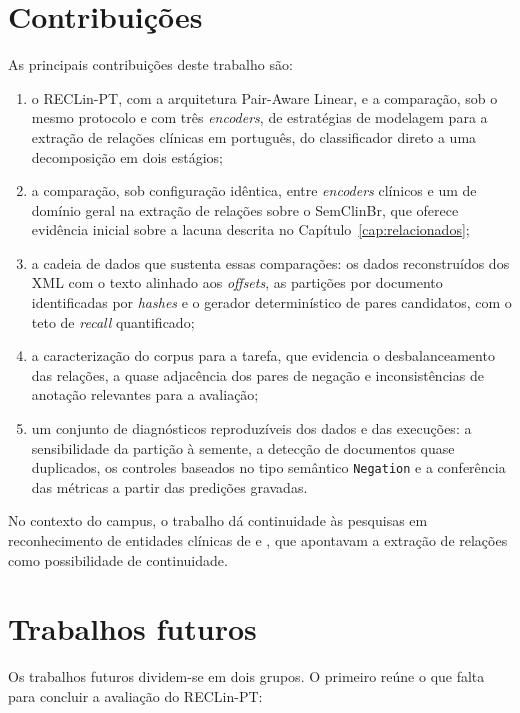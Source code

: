 \section{Contribuições}

As principais contribuições deste trabalho são:

\begin{enumerate}
  \item o RECLin-PT, com a arquitetura Pair-Aware Linear, e a comparação, sob o
        mesmo protocolo e com três \emph{encoders}, de estratégias de modelagem
        para a extração de relações clínicas em português, do classificador direto
        a uma decomposição em dois estágios;
  \item a comparação, sob configuração idêntica, entre \emph{encoders} clínicos e
        um de domínio geral na extração de relações sobre o SemClinBr, que oferece
        evidência inicial sobre a lacuna descrita no
        Capítulo~\ref{cap:relacionados};
  \item a cadeia de dados que sustenta essas comparações: os dados reconstruídos
        dos XML com o texto alinhado aos \emph{offsets}, as partições por documento
        identificadas por \emph{hashes} e o gerador determinístico de pares
        candidatos, com o teto de \emph{recall} quantificado;
  \item a caracterização do corpus para a tarefa, que evidencia o desbalanceamento
        das relações, a quase adjacência dos pares de negação e inconsistências de
        anotação relevantes para a avaliação;
  \item um conjunto de diagnósticos reproduzíveis dos dados e das execuções: a
        sensibilidade da partição à semente, a detecção de documentos quase
        duplicados, os controles baseados no tipo semântico \texttt{Negation} e a
        conferência das métricas a partir das predições gravadas.
\end{enumerate}

No contexto do campus, o trabalho dá continuidade às pesquisas em reconhecimento de
entidades clínicas de  e
, que apontavam a extração de relações como
possibilidade de continuidade.

\section{Trabalhos futuros}

Os trabalhos futuros dividem-se em dois grupos. O primeiro reúne o que falta para
concluir a avaliação do RECLin-PT:

